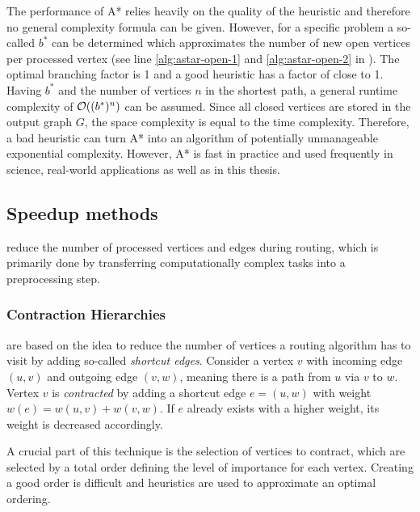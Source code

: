 			The performance of A* relies heavily on the quality of the heuristic and therefore no general complexity formula can be given\cite{russell-norvig-ai-modern-approach}.
			However, for a specific problem a so-called  $b^*$ can be determined which approximates the number of new open vertices per processed vertex (see line \ref{alg:astar-open-1} and \ref{alg:astar-open-2} in ).
			The optimal branching factor is 1 and a good heuristic has a factor of close to 1.
			Having $b^*$ and the number of vertices $n$ in the shortest path, a general runtime complexity of $\mathcal{O}((b^*)^n)$ can be assumed.
			Since all closed vertices are stored in the output graph $G$, the space complexity is equal to the time complexity.
			Therefore, a bad heuristic can turn A* into an algorithm of potentially unmanageable exponential complexity.
			However, A* is fast in practice and used frequently in science, real-world applications as well as in this thesis.
		
	\subsection{Speedup methods}
	\label{subsec:speedup-methods}
	
		 reduce the number of processed vertices and edges during routing, which is primarily done by transferring computationally complex tasks into a preprocessing step.
		
		\subsubsection{Contraction Hierarchies}
		\label{subsubsec:ch}
		
			 are based on the idea to reduce the number of vertices a routing algorithm has to visit by adding so-called \emph{shortcut edges}\cite{geisberger-contraction-hierarchies}.
			Consider a vertex $v$ with incoming edge $(u, v)$ and outgoing edge $(v, w)$, meaning there is a path from $u$ via $v$ to $w$.
			Vertex $v$ is \emph{contracted} by adding a shortcut edge $e = (u, w)$ with weight $w(e) = w(u, v) + w(v, w)$.
			If $e$ already exists with a higher weight, its weight is decreased accordingly.
			
			A crucial part of this technique is the selection of vertices to contract\cite[14]{geisberger-contraction-hierarchies}, which are selected by a total order defining the level of importance for each vertex.
			Creating a good order is difficult and heuristics are used to approximate an optimal ordering.
			
